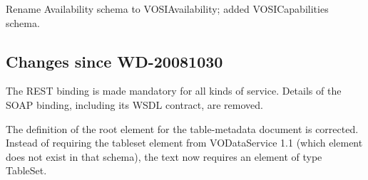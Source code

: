 \documentclass[11pt,letter]{ivoa}
\begin{document}
Rename Availability schema to VOSIAvailability; added VOSICapabilities schema.

\subsection{Changes since WD-20081030}

The REST binding is made mandatory for all kinds of service. Details of
the SOAP binding, including its WSDL contract, are removed.

The definition of the root element for the table-metadata document is
corrected. Instead of requiring the tableset element from VODataService
1.1 (which element does not exist in that schema), the text now requires
an element of type TableSet. 



\end{document}
